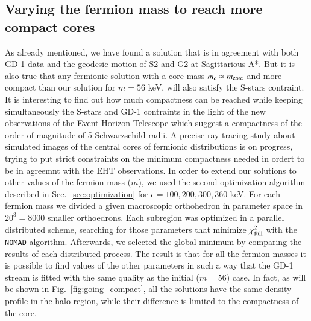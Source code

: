 \documentclass[twocolumn]{aa}
\begin{document}
\subsection{Varying the fermion mass to reach more compact cores}
As already mentioned, we have found a solution that is in agreement with both GD-1 data and
the geodesic motion of S2 and G2 at Sagittarious A*. But it is also true that any fermionic solution
with a core mass $m_c\approx m_{\rm{core}}$ and more compact than our solution for $m=56$ keV, will
also satisfy the S-stars contraint. It is interesting to find out how much compactness can be reached
while keeping simultaneously the S-stars and GD-1 contraints in the light of the new observations
of the Event Horizon Telescope which suggest a compactness of the order of magnitude of 5 Schwarzschild radii.
A precise ray tracing study about simulated images of the central
cores of fermionic distributions is on progress, trying to put strict constraints on the minimum
compactness needed in ordert to be in agreemnt with the EHT observations.
In order to extend our solutions to other values of the fermion mass ($m$), we used the second optimization algorithm described in Sec.~\ref{sec:optimization} for $\epsilon=100, 200, 300, 360$ keV. For each fermion mass we divided a given macroscopic orthohedron in parameter space in $20^3=8000$ smaller orthoedrons. Each subregion was optimized in a parallel distributed scheme, searching for those parameters that minimize $\chi^2_{\rm{full}}$ with the \texttt{NOMAD} algorithm. Afterwards, we selected the global minimum by comparing the results of each distributed process.
The result is that for all the fermion masses it is possible to find values of the other parameters in such a way that the GD-1 stream is fitted with the same quality as the initial ($m=56$) case. In fact, as will be shown in Fig.~\ref{fig:going_compact}, all the solutions have the same density profile in the halo region, while their difference is limited to the compactness of the core.
\end{document}
